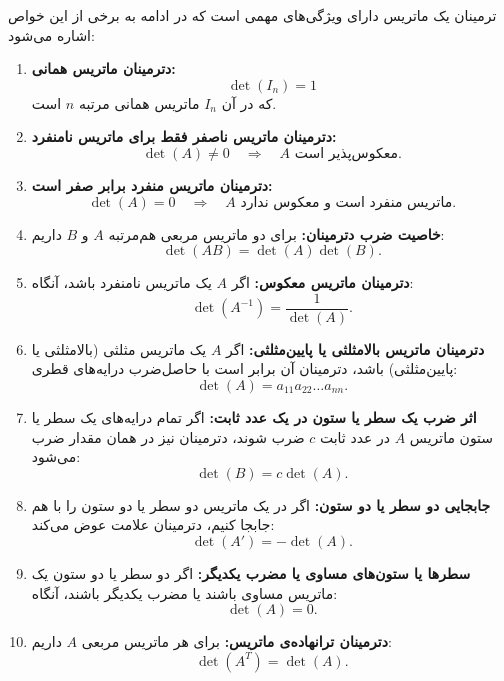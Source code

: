 \begin{nokteh}
	ترمینان یک ماتریس دارای ویژگی‌های مهمی است که در ادامه به برخی از این خواص اشاره می‌شود:
\begin{enumerate}
	\item \textbf{دترمینان ماتریس همانی:} 
	\[
	\det(I_n) = 1
	\]
	که در آن $I_n$ ماتریس همانی مرتبه $n$ است.
	
	\item \textbf{دترمینان ماتریس ناصفر فقط برای ماتریس نامنفرد:}
	\[
	\det(A) \neq 0 \quad \Rightarrow \quad A \text{ معکوس‌پذیر است.}
	\]
	
	\item \textbf{دترمینان ماتریس منفرد برابر صفر است:}
	\[
	\det(A) = 0 \quad \Rightarrow \quad A \text{ ماتریس منفرد است و معکوس ندارد.}
	\]
	
	\item \textbf{خاصیت ضرب دترمینان:}
	برای دو ماتریس مربعی هم‌مرتبه $A$ و $B$ داریم:
	\[
	\det(AB) = \det(A) \det(B).
	\]
	
	\item \textbf{دترمینان ماتریس معکوس:}
	اگر $A$ یک ماتریس نامنفرد باشد، آنگاه:
	\[
	\det(A^{-1}) = \frac{1}{\det(A)}.
	\]
	
	\item \textbf{دترمینان ماتریس بالامثلثی یا پایین‌مثلثی:}
	اگر $A$ یک ماتریس مثلثی (بالامثلثی یا پایین‌مثلثی) باشد، دترمینان آن برابر است با حاصل‌ضرب درایه‌های قطری:
	\[
	\det(A) = a_{11} a_{22} \dots a_{nn}.
	\]
	
	\item \textbf{اثر ضرب یک سطر یا ستون در یک عدد ثابت:}
	اگر تمام درایه‌های یک سطر یا ستون ماتریس $A$ در عدد ثابت $c$ ضرب شوند، دترمینان نیز در همان مقدار ضرب می‌شود:
	\[
	\det(B) = c \det(A).
	\]
	
	\item \textbf{جابجایی دو سطر یا دو ستون:}
	اگر در یک ماتریس دو سطر یا دو ستون را با هم جابجا کنیم، دترمینان علامت عوض می‌کند:
	\[
	\det(A') = -\det(A).
	\]
	
	\item \textbf{سطرها یا ستون‌های مساوی یا مضرب یکدیگر:}
	اگر دو سطر یا دو ستون یک ماتریس مساوی باشند یا مضرب یکدیگر باشند، آنگاه:
	\[
	\det(A) = 0.
	\]
	
	\item \textbf{دترمینان ترانهاده‌ی ماتریس:}
	برای هر ماتریس مربعی $A$ داریم:
	\[
	\det(A^T) = \det(A).
	\]
	
\end{enumerate}		
\end{nokteh}
